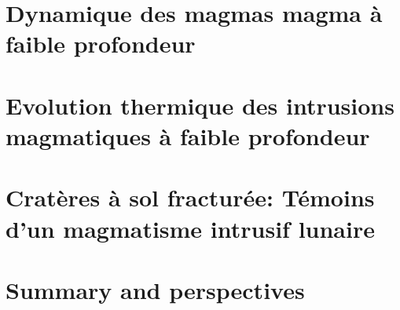 \documentclass[a4paper,12pt,twoside]{ThesisStyle}
\begin{document}


\dominitoc
\setcounter{tocdepth}{2}


\cleardoublepage



\cleardoublepage

\tableofcontents

\mainmatter

\setcounter{chapter}{-1}
\pagestyle{empty}



\part{Dynamique des magmas magma à faible profondeur}
\pagestyle{fancy}




\part{Evolution   thermique  des   intrusions  magmatiques   à faible
  profondeur}




\part{Cratères à  sol  fracturée: Témoins  d'un  magmatisme  intrusif
  lunaire}



% 

\part{Summary and perspectives}




% 
% 

% 

% 
% 
\end{document}
